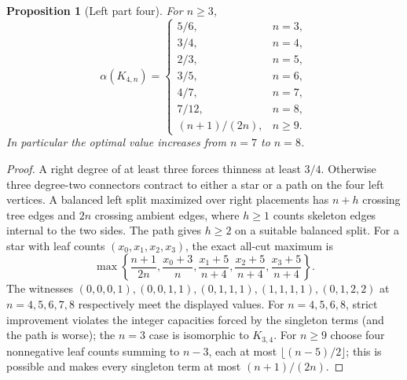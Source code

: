 \documentclass[11pt,a4paper]{article}
\newtheorem{proposition}[theorem]{Proposition}
\newcommand{\al}{\alpha}
\newcommand{\KK}[2]{K_{#1,#2}}
\begin{document}
\begin{proposition}[Left part four]\label{prop:k4}
For $n\ge3$,
\[
\al(\KK{4}{n})=\begin{cases}
5/6,&n=3,\\3/4,&n=4,\\2/3,&n=5,\\3/5,&n=6,\\4/7,&n=7,\\7/12,&n=8,\\(n+1)/(2n),&n\ge9.
\end{cases}
\]
In particular the optimal value \emph{increases} from $n=7$ to $n=8$.
\end{proposition}
\begin{proof}
A right degree of at least three forces thinness at least $3/4$. Otherwise three degree-two connectors contract to either a star or a path on the four left vertices. A balanced left split maximized over right placements has $n+h$ crossing tree edges and $2n$ crossing ambient edges, where $h\ge1$ counts skeleton edges internal to the two sides. The path gives $h\ge2$ on a suitable balanced split. For a star with leaf counts $(x_0,x_1,x_2,x_3)$, the exact all-cut maximum is
\[
\max\left\{\frac{n+1}{2n},\frac{x_0+3}{n},\frac{x_1+5}{n+4},\frac{x_2+5}{n+4},\frac{x_3+5}{n+4}\right\}.
\]
The witnesses $(0,0,0,1),(0,0,1,1),(0,1,1,1),(1,1,1,1),(0,1,2,2)$ at $n=4,5,6,7,8$ respectively meet the displayed values. For $n=4,5,6,8$, strict improvement violates the integer capacities forced by the singleton terms (and the path is worse); the $n=3$ case is isomorphic to $\KK{3}{4}$. For $n\ge9$ choose four nonnegative leaf counts summing to $n-3$, each at most $\lfloor(n-5)/2\rfloor$; this is possible and makes every singleton term at most $(n+1)/(2n)$.\end{proof}
\end{document}
